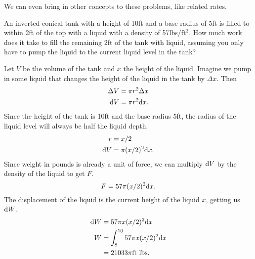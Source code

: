 \noindent
We can even bring in other concepts to these problems, like related rates.
\begin{example}
	An inverted conical tank with a height of 10ft and a base radius of 5ft is filled to within 2ft of the top with a liquid with a density of 57lbs/ft$^3$.
	How much work does it take to fill the remaining 2ft of the tank with liquid, assuming you only have to pump the liquid to the current liquid level in the tank?
\end{example}
Let $V$ be the volume of the tank and $x$ the height of the liquid.
Imagine we pump in some liquid that changes the height of the liquid in the tank by $\Delta x$.
Then
\begin{align*}
	\Delta V &= \pi r^2 \Delta x \\
	\mathrm{d} V &= \pi r^2 \mathrm{d} x.
\end{align*}
\indent
Since the height of the tank is 10ft and the base radius 5ft, the radius of the liquid level will always be half the liquid depth.
\begin{align*}
	r &= x/2 \\
	\mathrm{d} V &= \pi (x/2)^2 \mathrm{d} x.
\end{align*}
\indent
Since weight in pounds is already a unit of force, we can multiply $\mathrm{d} V$ by the density of the liquid to get $F$.
\begin{equation*}
	F = 57\pi(x/2)^2 \mathrm{d} x.
\end{equation*}
\indent
The displacement of the liquid is the current height of the liquid $x$, getting us $\mathrm{d} W$.
\begin{align*}
	\mathrm{d} W &= 57\pi x(x/2)^2 \mathrm{d} x \\
	W &= \int_{8}^{10}{57\pi x(x/2)^2 \mathrm{d} x} \\
	&= 21033\pi \text{ft lbs}.
\end{align*}

